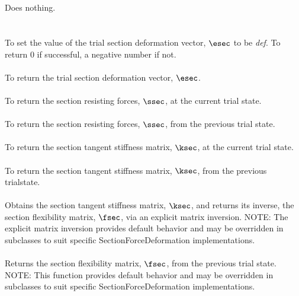  \\
\\ 
Does nothing. \\

 \\
  \\
To set the value of the trial section deformation vector, $\esec$ to be {\em
def}. To return $0$ if successful, a negative number if not.\\

 \\
To return the trial section deformation vector, $\esec$. \\

 \\
To return the section resisting forces, $\ssec$, at the current trial state. \\

 \\
To return the section resisting forces, $\ssec$, from the previous trial state. \\

 \\
To return the section tangent stiffness matrix, $\ksec$, at the current trial state. \\

 \\
To return the section tangent stiffness matrix, $\ksec$, from the previous trialstate. \\

 \\
Obtains the section tangent stiffness matrix, $\ksec$, and returns its
inverse, the section flexibility matrix, $\fsec$, via an
explicit matrix inversion.  NOTE: The explicit matrix
inversion provides default behavior and may be overridden in
subclasses to suit specific SectionForceDeformation implementations. \\

 \\
Returns the section flexibility matrix, $\fsec$, from the previous trial
state. NOTE: This function provides default behavior and may be
overridden in subclasses to suit specific SectionForceDeformation
implementations. \\


